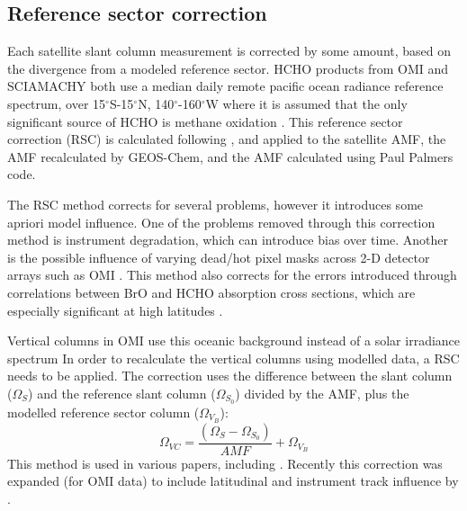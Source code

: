   \subsection{Reference sector correction}
    \label{Model:omiRecalc:RSC}
    Each satellite slant column measurement is corrected by some amount, based on the divergence from a modeled reference sector.
    HCHO products from OMI and SCIAMACHY both use a median daily remote pacific ocean radiance reference spectrum, over 15$^{\circ}$S-15$^{\circ}$N, 140$^{\circ}$-160$^{\circ}$W where it is assumed that the only significant source of HCHO is methane oxidation \parencite{DeSmedt2008,Barkley2013,Kurosu2014}.
    This reference sector correction (RSC) is calculated following \textcite{Abad2016}, and applied to the satellite AMF, the AMF recalculated by GEOS-Chem, and the AMF calculated using Paul Palmers code.
    
    The RSC method corrects for several problems, however it introduces some apriori model influence.
    One of the problems removed through this correction method is instrument degradation, which can introduce bias over time.
    Another is the possible influence of varying dead/hot pixel masks across 2-D detector arrays such as OMI \parencite{DeSmedt2015}.
    This method also corrects for the errors introduced through correlations between BrO and HCHO absorption cross sections, which are especially significant at high latitudes \parencite{Abad2015}.
    
    Vertical columns in OMI use this oceanic background instead of a solar irradiance spectrum
    In order to recalculate the vertical columns using modelled data, a RSC needs to be applied.
    The correction uses the difference between the slant column ($\Omega_S$) and the reference slant column ($\Omega_{S_0}$) divided by the AMF, plus the modelled reference sector column ($\Omega_{V_B}$):
    \begin{equation*}
      \Omega_{VC} = \frac{ \left( \Omega_S - \Omega_{S_0} \right) }{ AMF } + \Omega_{V_B}
    \end{equation*}
    This method is used in various papers, including \textcite{DeSmedt2008, DeSmedt2012, DeSmedt2015, Barkley2013, Bauwens2016}.
    Recently this correction was expanded (for OMI data) to include latitudinal and instrument track influence by \textcite{Abad2015}.
    
